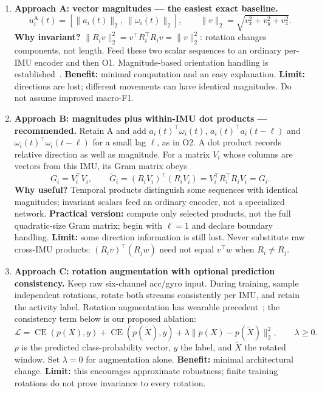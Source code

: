 \documentclass[10pt]{article}
\begin{document}
\begin{enumerate}[label=\textbf{\arabic*.}]
\item \textbf{Approach A: vector magnitudes --- the easiest exact baseline.}
\[
u_i^{\mathrm{A}}(t)=\left[\|a_i(t)\|_2,\ \|\omega_i(t)\|_2\right],
\qquad \|v\|_2=\sqrt{v_x^2+v_y^2+v_z^2}.
\]
\textbf{Why invariant?} $\|R_iv\|_2^2=v^{\top}R_i^{\top}R_iv=\|v\|_2^2$: rotation changes components, not length. Feed these two scalar sequences to an ordinary per-IMU encoder and then O1. Magnitude-based orientation handling is established~\cite{omyurtman}. \textbf{Benefit:} minimal computation and an easy explanation. \textbf{Limit:} directions are lost; different movements can have identical magnitudes. Do not assume improved macro-F1.

\item \textbf{Approach B: magnitudes plus within-IMU dot products --- recommended.}
Retain A and add $a_i(t)^{\top}\omega_i(t)$, $a_i(t)^{\top}a_i(t-\ell)$ and $\omega_i(t)^{\top}\omega_i(t-\ell)$ for a small lag $\ell$, as in O2. A dot product records relative direction as well as magnitude. For a matrix $V_i$ whose columns are vectors from this IMU, its Gram matrix obeys
\[
G_i=V_i^{\top}V_i,\qquad
\widetilde G_i=(R_iV_i)^{\top}(R_iV_i)=V_i^{\top}R_i^{\top}R_iV_i=G_i.
\]
\textbf{Why useful?} Temporal products distinguish some sequences with identical magnitudes; invariant scalars feed an ordinary encoder, not a specialized network. \textbf{Practical version:} compute only selected products, not the full quadratic-size Gram matrix; begin with $\ell=1$ and declare boundary handling. \textbf{Limit:} some direction information is still lost. Never substitute raw cross-IMU products: $(R_iv)^{\top}(R_jw)$ need not equal $v^{\top}w$ when $R_i\neq R_j$.

\item \textbf{Approach C: rotation augmentation with optional prediction consistency.}
Keep raw six-channel acc/gyro input. During training, sample independent rotations, rotate both streams consistently per IMU, and retain the activity label. Rotation augmentation has wearable precedent~\cite{omum}; the consistency term below is our proposed ablation:
\[
\mathcal L=\operatorname{CE}(p(X),y)+\operatorname{CE}(p(\widetilde X),y)
+\lambda\|p(X)-p(\widetilde X)\|_2^2,\qquad \lambda\geq0.
\]
$p$ is the predicted class-probability vector, $y$ the label, and $\widetilde X$ the rotated window. Set $\lambda=0$ for augmentation alone. \textbf{Benefit:} minimal architectural change. \textbf{Limit:} this encourages approximate robustness; finite training rotations do not prove invariance to every rotation.
\end{enumerate}
\end{document}

